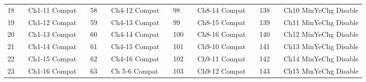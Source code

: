 \documentclass[]{article}
\begin{document}
\begin{landscape}
\begin{table}[]
\begin{tabular}{lllllllllllllll}
			18           &                     & Ch1-11  Compat                 &                    & 58           &                      & Ch4-12  Compat    &  & 98           &                      & Ch8-14  Compat    &  & 138                                                                                             &                                              & Ch10 MinYeChg Disable                              \\
			19           &                     & Ch1-12  Compat                 &                    & 59           &                      & Ch4-13  Compat    &  & 99           &                      & Ch8-15  Compat    &  & 139                                                                                             &                                              & Ch11 MinYeChg Disable                              \\
			20           &                     & Ch1-13  Compat                 &                    & 60           &                      & Ch4-14  Compat    &  & 100          &                      & Ch8-16  Compat    &  & 140                                                                                             &                                              & Ch12 MinYeChg Disable                              \\
			21           &                     & Ch1-14  Compat                 &                    & 61           &                      & Ch4-15  Compat    &  & 101          &                      & Ch9-10  Compat    &  & 141                                                                                             &                                              & Ch13 MinYeChg Disable                              \\
			22           &                     & Ch1-15  Compat                 &                    & 62           &                      & Ch4-16  Compat    &  & 102          &                      & Ch9-11  Compat    &  & 142                                                                                             &                                              & Ch14 MinYeChg Disable                              \\
			23           &                     & Ch1-16  Compat                 &                    & 63           &                      & Ch 5-6 Compat     &  & 103          &                      & Ch9-12  Compat    &  & 143                                                                                             &                                              & Ch15 MinYeChg Disable                              \\

\end{tabular}
\end{table}
\end{landscape}
\end{document}
